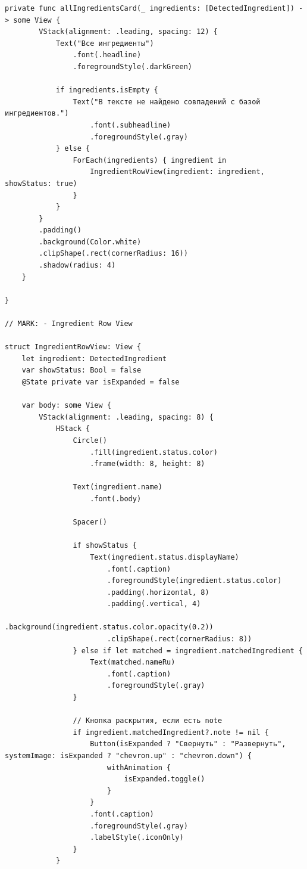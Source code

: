 \begin{lstlisting}[basicstyle=\tiny\ttfamily,breaklines=true]
    private func allIngredientsCard(_ ingredients: [DetectedIngredient]) -> some View {
        VStack(alignment: .leading, spacing: 12) {
            Text("Все ингредиенты")
                .font(.headline)
                .foregroundStyle(.darkGreen)
            
            if ingredients.isEmpty {
                Text("В тексте не найдено совпадений с базой ингредиентов.")
                    .font(.subheadline)
                    .foregroundStyle(.gray)
            } else {
                ForEach(ingredients) { ingredient in
                    IngredientRowView(ingredient: ingredient, showStatus: true)
                }
            }
        }
        .padding()
        .background(Color.white)
        .clipShape(.rect(cornerRadius: 16))
        .shadow(radius: 4)
    }
    
}

// MARK: - Ingredient Row View

struct IngredientRowView: View {
    let ingredient: DetectedIngredient
    var showStatus: Bool = false
    @State private var isExpanded = false
    
    var body: some View {
        VStack(alignment: .leading, spacing: 8) {
            HStack {
                Circle()
                    .fill(ingredient.status.color)
                    .frame(width: 8, height: 8)
                
                Text(ingredient.name)
                    .font(.body)
                
                Spacer()
                
                if showStatus {
                    Text(ingredient.status.displayName)
                        .font(.caption)
                        .foregroundStyle(ingredient.status.color)
                        .padding(.horizontal, 8)
                        .padding(.vertical, 4)
                        .background(ingredient.status.color.opacity(0.2))
                        .clipShape(.rect(cornerRadius: 8))
                } else if let matched = ingredient.matchedIngredient {
                    Text(matched.nameRu)
                        .font(.caption)
                        .foregroundStyle(.gray)
                }
                
                // Кнопка раскрытия, если есть note
                if ingredient.matchedIngredient?.note != nil {
                    Button(isExpanded ? "Свернуть" : "Развернуть", systemImage: isExpanded ? "chevron.up" : "chevron.down") {
                        withAnimation {
                            isExpanded.toggle()
                        }
                    }
                    .font(.caption)
                    .foregroundStyle(.gray)
                    .labelStyle(.iconOnly)
                }
            }
            

\end{lstlisting}
